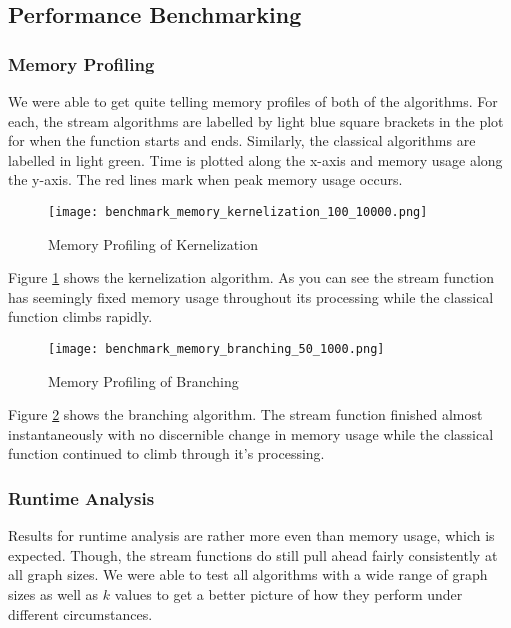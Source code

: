 \subsection{Performance Benchmarking}

\subsubsection{Memory Profiling}

We were able to get quite telling memory profiles of both of the algorithms.
For each, the stream algorithms are labelled by light blue square brackets in
the plot for when the function starts and ends. Similarly, the classical
algorithms are labelled in light green. Time is plotted along the x-axis and
memory usage along the y-axis. The red lines mark when peak memory usage occurs.

\begin{figure}[htb]
    \centering
    \texttt{[image: benchmark\_memory\_kernelization\_100\_10000.png]}
    \caption{Memory Profiling of Kernelization}
    \label{fig:benchmark_mem_kernelization}
\end{figure}

Figure \ref{fig:benchmark_mem_kernelization} shows the kernelization algorithm.
As you can see the stream function has seemingly fixed memory usage throughout
its processing while the classical function climbs rapidly.

\begin{figure}[htb]
    \centering
    \texttt{[image: benchmark\_memory\_branching\_50\_1000.png]}
    \caption{Memory Profiling of Branching}
    \label{fig:benchmark_mem_branching}
\end{figure}

Figure \ref{fig:benchmark_mem_branching} shows the branching algorithm. The
stream function finished almost instantaneously with no discernible change in
memory usage while the classical function continued to climb through it's
processing.

\subsubsection{Runtime Analysis}

Results for runtime analysis are rather more even than memory usage, which is
expected. Though, the stream functions do still pull ahead fairly consistently
at all graph sizes. We were able to test all algorithms with a wide range of
graph sizes as well as \(k\) values to get a better picture of how they perform
under different circumstances.

